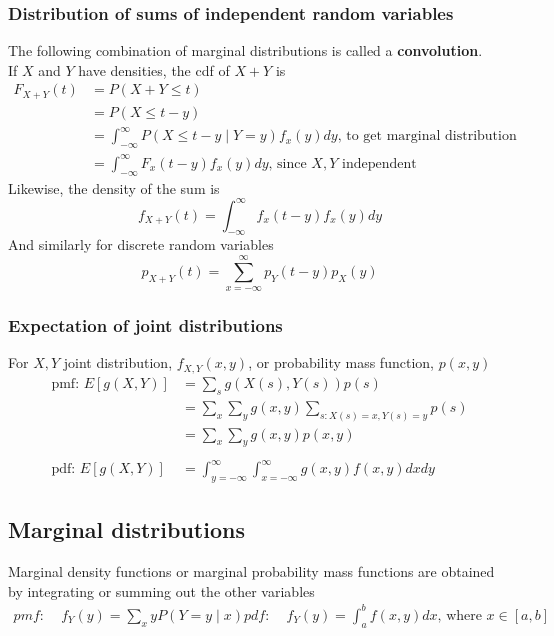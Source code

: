 \documentclass{article}
\begin{document}
\subsubsection{Distribution of sums of independent random variables}
The following combination of marginal distributions is called a \textbf{convolution}.\\
If $X$ and $Y$ have densities, the cdf of $X+Y$ is
\begin{align*}
    F_{X+Y}(t) &= P(X+Y\leq t)\\
    &= P(X \leq t-y)\\
    &= \int_{-\infty}^\infty P(X \leq t-y \mid Y=y) f_x(y)dy \textrm{, to get marginal distribution}\\
    &= \int_{-\infty}^\infty F_x(t-y) f_x(y)dy \textrm{, since $X,Y$ independent}
\end{align*}
Likewise, the density of the sum is
\begin{equation*}
    f_{X+Y}(t) = \int_{-\infty}^\infty f_x(t-y) f_x(y)dy
\end{equation*}
And similarly for discrete random variables
\begin{equation*}
    p_{X + Y}(t) = \sum_{x=-\infty}^{\infty} p_Y(t-y) p_X(y)
\end{equation*}

\subsubsection{Expectation of joint distributions}
For $X,Y$ joint distribution, $f_{X,Y}(x,y)$, or probability mass function, $p(x,y)$
\begin{align*}
    \textrm{pmf: } E[g(X,Y)] &= \sum_s g(X(s), Y(s))p(s)\\
    &= \sum_x\sum_y g(x,y) \sum_{s:X(s)=x,Y(s)=y}p(s)\\
    &= \sum_x\sum_y g(x,y)p(x,y)\\ \\
    \textrm{pdf: } E[g(X,Y)] &= \int_{y= -\infty}^{\infty} \int_{x= -\infty}^{\infty} g(x,y)f(x,y)dxdy
\end{align*}

\subsection{Marginal distributions}
Marginal density functions or marginal probability mass functions are obtained by integrating or summing out the other variables
\begin{align*}
    pmf: &\;  f_Y(y) = \sum_x y P(Y = y \mid x)
    pdf: &\; f_Y(y) = \int_a^b f(x,y)dx \textrm{, where } x \in [a,b]
\end{align*}
\end{document}
